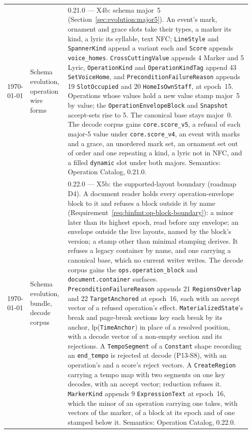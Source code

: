 \documentclass[11pt,letterpaper]{report}
\newcommand{\tablenums}[1]{{\addfontfeatures{Numbers={Lining,Tabular}}#1}}
\newcommand{\ub}{\_\allowbreak}
\begin{document}
\begin{longtable}{p{2cm} p{2.5cm} p{9cm}}
    \today & Schema evolution, operation wire forms & 0.21.0 --- X4b:
  schema major~5 (Section~\ref{sec:evolution:major5}). An event's mark,
  ornament and grace slots take their types, a marker its kind, a lyric its
  syllable, text NFC; \texttt{LineStyle} and \texttt{SpannerKind} append a
  variant each and \texttt{Score} appends \texttt{voice\_homes}.
  \texttt{CrossCuttingValue} appends \tablenums{4} Marker and \tablenums{5}
  Lyric, \texttt{OperationKind} and \texttt{OperationKindTag} append
  \tablenums{43} \texttt{SetVoiceHome}, and
  \texttt{PreconditionFailureReason} appends \tablenums{19}
  \texttt{SlotOccupied} and \tablenums{20} \texttt{HomeIsOwnStaff}, at
  epoch~15. Operations whose values hold a new
  value stamp major~5 by value; the \texttt{OperationEnvelopeBlock} and
  \texttt{Snapshot} accept-sets rise to \tablenums{5}. The canonical base
  stays major~0. The decode corpus gains \texttt{core.score\_v5}, a refusal
  of each major-5 value under \texttt{core.score\_v4}, an event with marks
  and a grace, an unordered mark set, an ornament set out of order and one
  repeating a kind, a lyric not in NFC, and a filled
  \texttt{dynamic} slot under both majors. Semantics: Operation Catalog,
  0.21.0. \\
    \today & Schema evolution, bundle, decode corpus & 0.22.0 --- X5b: the
  supported-layout boundary (roadmap D4). A document reader holds every
  operation-envelope block to it and refuses a block outside it by name
  (Requirement~\ref{req:binfmt:op-block-boundary}): a minor later than its
  highest epoch, read before any envelope; an envelope outside the live
  layouts, named by the block's version; a stamp other than minimal stamping
  derives. It refuses a legacy container by name, and one carrying a
  canonical base, which no current writer writes. The decode corpus gains
  the \texttt{ops.operation\ub block} and \texttt{document.container}
  surfaces. \texttt{PreconditionFailureReason} appends \tablenums{21}
  \texttt{RegionsOverlap} and \tablenums{22} \texttt{TargetAnchored} at
  epoch~16, each with an accept vector of a refused operation's effect. \texttt{MaterializedState}'s break
  and page-break sections key each break by its anchor,
  $\mathrm{lp}$(\texttt{TimeAnchor}) in place of a resolved position, with a
  decode vector of a non-empty section and its rejections. A
  \texttt{TempoSegment} of a \texttt{Constant} shape recording an
  \texttt{end\_tempo} is rejected at decode (P13-S8), with an operation's and a
  score's reject vectors. A \texttt{CreateRegion} carrying a tempo map with
  two segments on one key decodes, with an accept vector; reduction refuses
  it. \texttt{MarkerKind} appends \tablenums{9}
  \texttt{ExpressionText} at epoch~16, which the minor of an operation
  carrying one takes, with vectors of the marker, of a block at its epoch and
  of one stamped below it. Semantics: Operation Catalog, 0.22.0. \\
\bottomrule
\end{longtable}
\end{document}
